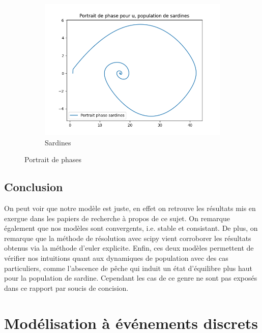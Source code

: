 \documentclass[a4paper, 11pt]{report}%
\begin{document}
\begin{figure}[!h]
\begin{subfigure}[b]{.3\textwidth}
        		\centering
       			\includegraphics[width=\textwidth]{figures/Portrait_de_phase_sardine.png}
            	\caption{Sardines}
    		\end{subfigure}
    		\caption{Portrait de phases}
		\end{figure}


        \subsection{Conclusion}
        On peut voir que notre modèle est juste, en effet on retrouve les résultats mis en exergue 
        dans les papiers de recherche à propos de ce sujet. On remarque également que nos modèles
        sont convergents, i.e. stable et consistant. De plus, on remarque que la méthode de résolution avec
        scipy vient corroborer les résultats obtenus via la méthode d'euler explicite. Enfin, ces deux modèles
        permettent de vérifier nos intuitions quant aux dynamiques de population avec des cas particuliers,
        comme l'abscence de pêche qui induit un état d'équilibre plus haut pour la population de sardine. 
        Cependant les cas de ce genre ne sont pas exposés dans ce rapport par soucis de concision. 

    \section{Modélisation à événements discrets}
\end{document}
